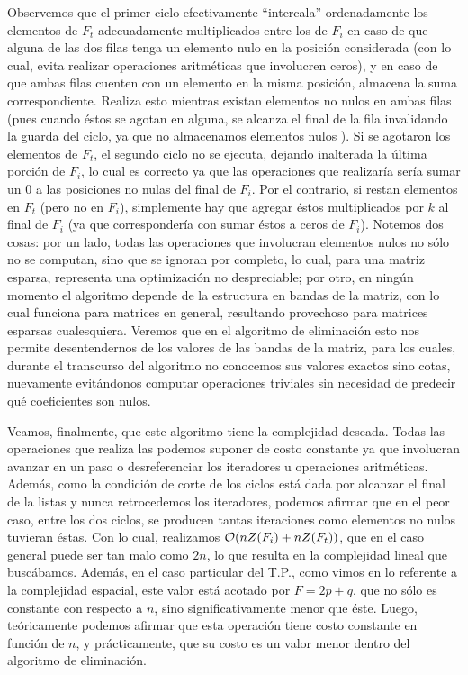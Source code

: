 Observemos que el primer ciclo efectivamente ``intercala'' ordenadamente los elementos de $F_t$ adecuadamente multiplicados entre los de $F_i$ en caso de que alguna de las dos filas tenga un elemento nulo en la posición considerada (con lo cual, evita realizar operaciones aritméticas que involucren ceros), y en caso de que ambas filas cuenten con un elemento en la misma posición, almacena la suma correspondiente. Realiza esto mientras existan elementos no nulos en ambas filas (pues cuando éstos se agotan en alguna, se alcanza el final de la fila invalidando la guarda del ciclo, ya que no almacenamos elementos nulos ). Si se agotaron los elementos de $F_t$, el segundo ciclo no se ejecuta, dejando inalterada la última porción de $F_i$, lo cual es correcto ya que las operaciones que realizaría sería sumar un $0$ a las posiciones no nulas del final de $F_i$. Por el contrario, si restan elementos en $F_t$ (pero no en $F_i$), simplemente hay que agregar éstos multiplicados por $k$ al final de $F_i$ (ya que 
correspondería con sumar éstos a ceros de $F_i$). Notemos dos cosas: por un lado, todas las operaciones que involucran elementos nulos no sólo no se computan, sino que se ignoran por completo, lo cual, para una matriz esparsa, representa una optimización no despreciable; por otro, en ningún momento el algoritmo depende de la estructura en bandas de la matriz, con lo cual funciona para matrices en general, resultando provechoso para matrices esparsas cualesquiera. Veremos que en el algoritmo de eliminación esto nos permite desentendernos de los valores de las bandas de la matriz, para los cuales, durante el transcurso del algoritmo no conocemos sus valores exactos sino cotas, nuevamente evitándonos computar operaciones triviales sin necesidad de predecir qué coeficientes son nulos.
 
 Veamos, finalmente, que este algoritmo tiene la complejidad deseada. Todas las operaciones que realiza las podemos suponer de costo constante ya que involucran avanzar en un paso o desreferenciar los iteradores u operaciones aritméticas. Además, como la condición de corte de los ciclos está dada por alcanzar el final de la listas y nunca retrocedemos los iteradores, podemos afirmar que en el peor caso, entre los dos ciclos, se producen tantas iteraciones como elementos no nulos tuvieran éstas. Con lo cual, realizamos $\mathcal{O}(nZ(F_i) + nZ(F_t))$, que en el caso general puede ser tan malo como $2n$, lo que resulta en la complejidad lineal que buscábamos. Además, en el caso particular del T.P., como vimos en lo referente a la complejidad espacial, este valor está acotado por $F = 2p+q$, que no sólo es constante con respecto a $n$, sino significativamente menor que éste. Luego, teóricamente podemos afirmar que esta operación tiene costo constante en función de $n$, y prácticamente, que su costo es un valor menor 
dentro del algoritmo de eliminación. 

